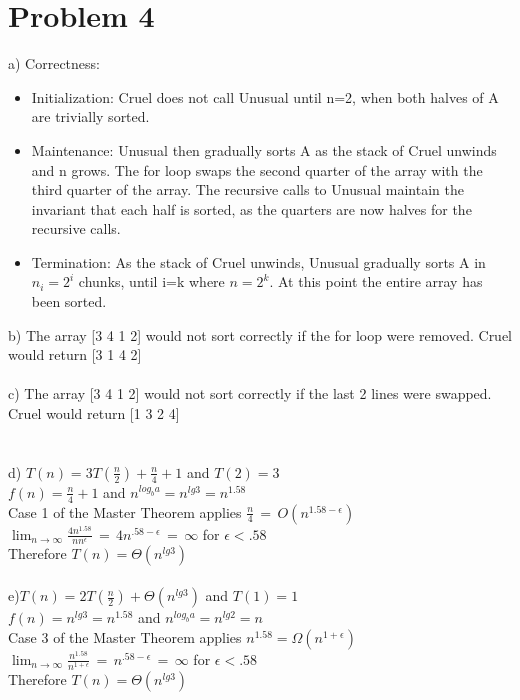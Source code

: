 \documentclass{article}
\begin{document}
\section*{Problem 4}
a) Correctness: 
\begin{itemize}
    \item Initialization: Cruel does not call Unusual until n=2, when both halves of A are trivially sorted. 
    
    \item Maintenance: Unusual then gradually sorts A as the stack of Cruel unwinds and n grows. The for loop swaps the second quarter of the array with the 
    third quarter of the array.  The recursive calls to Unusual maintain the invariant that each half is sorted, as the quarters are now 
    halves for the recursive calls.
    
    \item Termination: As the stack of Cruel unwinds, Unusual gradually sorts A in $n_i=2^i$ chunks, until i=k where $n=2^k$.  At this point the entire array
    has been sorted.
\end{itemize}
b) The array [3 4 1 2] would not sort correctly if the for loop were removed.  Cruel would return [3 1 4 2]\\\\
c) The array [3 4 1 2] would not sort correctly if the last 2 lines were swapped.  Cruel would return [1 3 2 4]\\\\\\
d) $T(n)=3T(\frac{n}{2})+\frac{n}{4}+1$ and $T(2)=3$\\
$f(n)=\frac{n}{4}+1$ and $n^{log_ba}=n^{lg3}=n^{1.58}$\\
Case 1 of the Master Theorem applies $\frac{n}{4}\,=\,O(n^{1.58-\epsilon})$\\
$\lim_{n \to \infty}\frac{4n^{1.58}}{nn^{\epsilon}}\,=\,4n^{.58-\epsilon}\,=\,\infty$ for $\epsilon<.58$\\
Therefore $T(n)=\Theta(n^{lg3})$\\\\
e)$T(n)=2T(\frac{n}{2})+\Theta(n^{lg3})$ and $T(1)=1$\\
$f(n)=n^{lg3}=n^{1.58}$ and $n^{log_ba}=n^{lg2}=n$\\
Case 3 of the Master Theorem applies $n^{1.58}=\Omega(n^{1+\epsilon})$\\
$\lim_{n \to \infty}\frac{n^{1.58}}{n^{1+\epsilon}}\,=\,n^{.58-\epsilon}\,=\,\infty$ for $\epsilon<.58$\\
Therefore $T(n)=\Theta(n^{lg3})$
\end{document}

